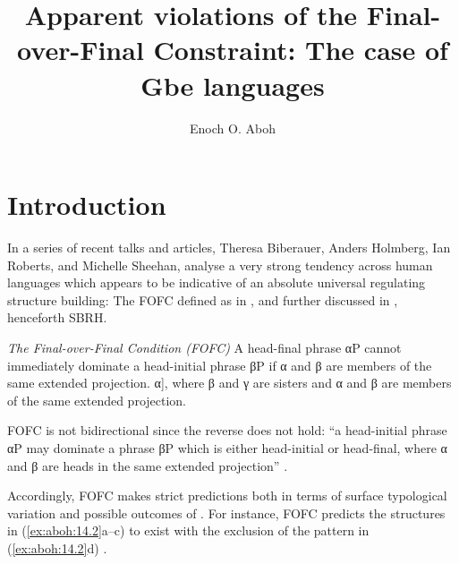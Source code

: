 \documentclass[output=paper]{langsci/langscibook}
\author{Enoch O. Aboh\affiliation{University of Amsterdam}}
\title{Apparent violations of the Final-over-Final Constraint: The case of Gbe languages}
\begin{document}
\glsresetall

\section{Introduction}

In a series of recent talks and articles, Theresa Biberauer, Anders Holmberg,
Ian Roberts, and Michelle Sheehan, analyse a very strong tendency across human
languages which appears to be indicative of an absolute universal regulating
structure building: The \gls{FOFC} defined as in , and further
discussed in \textcite{SheeBibRobHol2017}, henceforth
SBRH.

\ea\label{ex:aboh:14.1} \emph{The Final-over-Final Condition (FOFC)}
    \ea A head-final phrase αP cannot immediately dominate a head-initial
    phrase βP if α and β are members of the same extended projection.
    \ex *[\textsubscript{α}\textsuperscript{P}
    [\textsubscript{β}\textsuperscript{P} β γ] α], where β and  γ are sisters
    and α and β are members of the same extended projection.
    \z
\z

FOFC is not bidirectional since the reverse does not hold: “a head-initial
phrase αP may dominate a phrase βP which is either head-initial or head-final,
where α and β are heads in the same extended projection”
\parencite[cf.][171]{BibHolRob2014}.

Accordingly, \gls{FOFC} makes strict predictions both in terms of surface typological
variation and possible outcomes of 
\parencite[cf.][]{BibNewShee2009}. For instance, \gls{FOFC} predicts the structures
in (\ref{ex:aboh:14.2}a--c) to exist with the exclusion of the pattern in (\ref{ex:aboh:14.2}d)
\parencite[cf.][171]{BibHolRob2014}.
\end{document}
